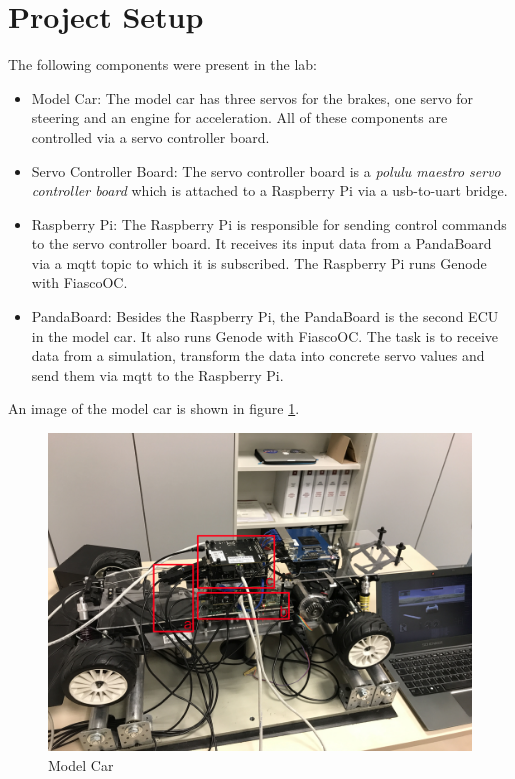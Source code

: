 \section{Project Setup}
The following components were present in the lab:

\begin{itemize}
    \item Model Car: The model car has three servos for the brakes, one servo for steering and an engine for acceleration. All of these components are controlled via a servo controller board.
    
    \item Servo Controller Board: The servo controller board is a \textit{polulu maestro servo controller board} which is attached to a Raspberry Pi via a usb-to-uart bridge.

    \item Raspberry Pi: The Raspberry Pi is responsible for sending control commands to the servo controller board. It receives its input data from a PandaBoard via a mqtt topic to which it is subscribed. The Raspberry Pi runs Genode with FiascoOC.

    \item PandaBoard: Besides the Raspberry Pi, the PandaBoard is the second ECU in the model car. It also runs Genode with FiascoOC. The task is to receive data from a simulation, transform the data into concrete servo values and send them via mqtt to the Raspberry Pi.
\end{itemize}

An image of the model car is shown in figure \ref{fig:model}.

\begin{figure}[h]
    \centering
    \includegraphics[width=0.70\linewidth]{images/model}
    \caption{Model Car}
    \label{fig:model}
\end{figure}



